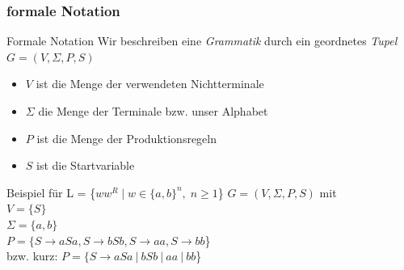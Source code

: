 %
%
%
%

\subsubsection{formale Notation}
\begin{frame}[fragile]{Formale Notation}
    Wir beschreiben eine \alert{\emph{Grammatik}} durch ein geordnetes \alert{\emph{Tupel}} $G = (V, \Sigma, P, S)$
    \begin{itemize}
        \item $V$ ist die Menge der verwendeten Nichtterminale
        \item $\Sigma$ die Menge der Terminale bzw. unser Alphabet
        \item $P$ ist die Menge der Produktionsregeln
        \item $S$ ist die Startvariable
    \end{itemize}
    \begin{exampleblock}{Beispiel für  L = \{$ww^R \mid w \in \{a, b\}^n, \; n \geq 1$\}}
        $G = (V,\Sigma,P,S)$ mit\\
        $V = \{S\}$\\
        $\Sigma = \{a,b\}$\\
        $P = \{S \rightarrow aSa, S \rightarrow bSb, S \rightarrow aa, S \rightarrow bb$\}\\
        \qquad bzw. kurz: $P = \{S \rightarrow aSa\ |\ bSb\ |\ aa\ |\ bb$\}
    \end{exampleblock}
\end{frame}

